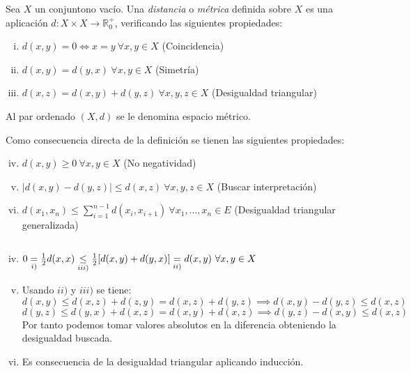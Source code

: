 \documentclass[ oneside,openany,titlepage,numbers=noenddot,headinclude,%
                footinclude=true,cleardoublepage=empty,abstractoff, %
                BCOR=5mm,paper=a4,fontsize=11pt,%
                spanish,american%
                ]{scrreprt}
\begin{document}
\begin{definition}[Distancia]
	Sea $X$ un  conjuntono vacío. Una \emph{distancia} o \emph{métrica} definida sobre $X$ es una aplicación $d:X\times X \to \mathbb{R}^{+}_{0}$, verificando las siguientes propiedades:
	
	\begin{enumerate}[i)]
		\item $d(x,y)=0  \iff x = y \ \forall x,y \in X$ (Coincidencia)
		\item $d(x,y)=d(y,x) \ \forall x,y \in X$ (Simetría)
		\item $d(x,z)=d(x,y)+d(y,z) \ \forall x,y,z \in X$ (Desigualdad triangular)
	\end{enumerate}
	
	Al par ordenado $(X,d)$ se le denomina espacio métrico.
\end{definition}

\remb
Como consecuencia directa de la definición se tienen las siguientes propiedades:

\begin{enumerate}[i)]
	\setcounter{enumi}{3}
	\item $d(x,y) \ge 0 \ \forall x,y \in X$ (No negatividad)
	\item $|d(x,y)-d(y,z)| \le d(x,z) \ \forall x,y,z \in X$ (Buscar interpretación)
	\item $d(x_1,x_n) \le \sum_{i=1}^{n-1}d(x_i,x_{i+1}) \ \forall x_1,\dots,x_n \in E$ (Desigualdad triangular generalizada)
\end{enumerate}

\proofb
 $ $\newline
	\begin{enumerate}[i)]
		\setcounter{enumi}{3}
		\item $ 0 \underset{i)}{=} \frac{1}{2}d(x,x) \underset{iii)}{\le}\frac{1}{2}[d(x,y)+d(y,x)]\underset{ii)}{=}d(x,y) \ \forall x,y \in X$
		
		\item Usando $ii)$ y $iii)$ se tiene:
		\[d(x,y) \le d(x,z) + d(z,y) = d(x,z)+d(y,z) \implies d(x,y)-d(y,z)\le d(x,z)\]
		\[d(y,z) \le d(y,x) + d(x,z) = d(x,y)+d(x,z) \implies d(y,z)-d(x,y)\le d(x,z) \]
		Por tanto podemos tomar valores absolutos en la diferencia obteniendo la desigualdad buscada.
		
		\item Es consecuencia de la desigualdad triangular aplicando inducción.
	\end{enumerate}
\proofe

\reme
\end{document}
